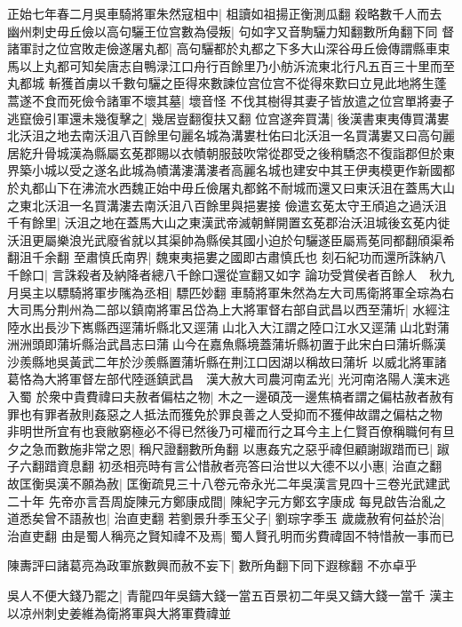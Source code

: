正始七年春二月吳車騎將軍朱然寇柤中|{
	柤讀如祖揚正衡測瓜翻}
殺略數千人而去　幽州刺史毋丘儉以高句驪王位宫數為侵叛|{
	句如字又音駒驪力知翻數所角翻下同}
督諸軍討之位宫敗走儉遂屠丸都|{
	高句驪都於丸都之下多大山深谷毋丘儉傳謂縣車束馬以上丸都可知矣唐志自鴨渌江口舟行百餘里乃小舫泝流東北行凡五百三十里而至丸都城}
斬獲首虜以千數句驪之臣得來數諫位宫位宫不從得來歎曰立見此地將生蓬蒿遂不食而死儉令諸軍不壞其墓|{
	壞音怪}
不伐其樹得其妻子皆放遣之位宫單將妻子逃竄儉引軍還未幾復擊之|{
	幾居豈翻復扶又翻}
位宫遂奔買溝|{
	後漢書東夷傳買溝婁北沃沮之地去南沃沮八百餘里句麗名城為溝婁杜佑曰北沃沮一名買溝婁又曰高句麗居紇升骨城漢為縣屬玄莬郡賜以衣幘朝服鼓吹常從郡受之後稍驕恣不復詣郡但於東界築小城以受之遂名此城為幘溝漊溝漊者高麗名城也建安中其王伊夷模更作新國都於丸都山下在沸流水西魏正始中毋丘儉屠丸都銘不耐城而還又曰東沃沮在蓋馬大山之東北沃沮一名買溝漊去南沃沮八百餘里與挹婁接}
儉遣玄莬太守王頎追之過沃沮千有餘里|{
	沃沮之地在蓋馬大山之東漢武帝滅朝鮮開置玄莬郡治沃沮城後玄莬内徙沃沮更屬樂浪光武廢省就以其渠帥為縣侯其國小迫於句驪遂臣屬焉莬同都翻頎渠希翻沮千余翻}
至肅慎氏南界|{
	魏東夷挹婁之國即古肅慎氏也}
刻石紀功而還所誅納八千餘口|{
	言誅殺者及納降者總八千餘口還從宣翻又如字}
論功受賞侯者百餘人　秋九月吳主以驃騎將軍步隲為丞相|{
	驃匹妙翻}
車騎將軍朱然為左大司馬衛將軍全琮為右大司馬分荆州為二部以鎮南將軍呂岱為上大將軍督右部自武昌以西至蒲圻|{
	水經注陸水出長沙下嶲縣西逕蒲圻縣北又逕蒲山北入大江謂之陸口江水又逕蒲山北對蒲洲洲頭即蒲圻縣治武昌志曰蒲山今在嘉魚縣境蓋蒲圻縣初置于此宋白曰蒲圻縣漢沙羨縣地吳黃武二年於沙羨縣置蒲圻縣在荆江口因湖以稱故曰蒲圻}
以威北將軍諸葛恪為大將軍督左部代陸遜鎮武昌　漢大赦大司農河南孟光|{
	光河南洛陽人漢末逃入蜀}
於衆中貴費禕曰夫赦者偏枯之物|{
	木之一邊碩茂一邊焦槁者謂之偏枯赦者赦有罪也有罪者赦則姦惡之人抵法而獲免於罪良善之人受抑而不獲伸故謂之偏枯之物}
非明世所宜有也衰敝窮極必不得已然後乃可權而行之耳今主上仁賢百僚稱職何有旦夕之急而數施非常之恩|{
	稱尺證翻數所角翻}
以惠姦宄之惡乎禕但顧謝踧踖而已|{
	踧子六翻踖資息翻}
初丞相亮時有言公惜赦者亮答曰治世以大德不以小惠|{
	治直之翻}
故匡衡吳漢不願為赦|{
	匡衡疏見三十八卷元帝永光二年吳漢言見四十三卷光武建武二十年}
先帝亦言吾周旋陳元方鄭康成間|{
	陳紀字元方鄭玄字康成}
每見啟告治亂之道悉矣曾不語赦也|{
	治直吏翻}
若劉景升季玉父子|{
	劉琮字季玉}
歲歲赦宥何益於治|{
	治直吏翻}
由是蜀人稱亮之賢知禕不及焉|{
	蜀人賢孔明而劣費禕固不特惜赦一事而已}


陳夀評曰諸葛亮為政軍旅數興而赦不妄下|{
	數所角翻下同下遐稼翻}
不亦卓乎

吳人不便大錢乃罷之|{
	青龍四年吳鑄大錢一當五百景初二年吳又鑄大錢一當千}
漢主以凉州刺史姜維為衛將軍與大將軍費禕並

